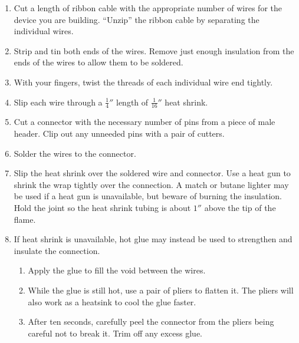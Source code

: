 \begin{enumerate}

 \item Cut a length of ribbon cable with the appropriate number of
 wires for the device you are building.  ``Unzip'' the ribbon cable by
 separating the individual wires.

 \item Strip and tin both ends of the wires. Remove just enough
 insulation from the ends of the wires to allow them to be soldered.

 \item With your fingers, twist the threads of each individual wire
 end tightly.

 \item Slip each wire through a $\frac{1}{4}''$ length of
 $\frac{1}{16}''$ heat shrink.

 \item Cut a connector with the necessary number of pins from a piece
 of male header. Clip out any unneeded pins with a pair of cutters.

 \item Solder the wires to the connector.

 \item Slip the heat shrink over the soldered wire and connector. Use
 a heat gun to shrink the wrap tightly over the connection. A match or
 butane lighter may be used if a heat gun is unavailable, but beware
 of burning the insulation.  Hold the joint so the heat shrink tubing
 is about $1''$ above the tip of the flame.

 \item If heat shrink is unavailable, hot glue may instead be used to
 strengthen and insulate the connection.

 \begin{enumerate}

  \item Apply the glue to fill the void between the wires.

  \item While the glue is still hot, use a pair of pliers to flatten
  it. The pliers will also work as a heatsink to cool the glue faster.

  \item After ten seconds, carefully peel the connector from the
  pliers being careful not to break it. Trim off any excess glue.

 \end{enumerate}

\end{enumerate}

